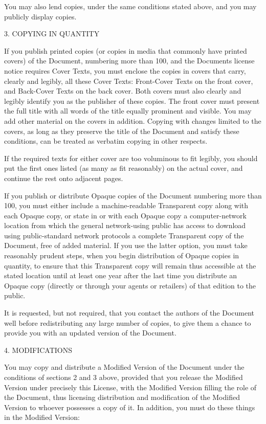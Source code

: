 \documentclass[
  english,
  11pt,
  a4paper,
]{article}
\begin{document}
You may also lend copies, under the same conditions stated above, and
you may publicly display copies.

3. COPYING IN QUANTITY

If you publish printed copies (or copies in media that commonly have
printed covers) of the Document, numbering more than 100, and the
Document\textquotesingle s license notice requires Cover Texts, you must
enclose the copies in covers that carry, clearly and legibly, all these
Cover Texts: Front-Cover Texts on the front cover, and Back-Cover Texts
on the back cover. Both covers must also clearly and legibly identify
you as the publisher of these copies. The front cover must present the
full title with all words of the title equally prominent and visible.
You may add other material on the covers in addition. Copying with
changes limited to the covers, as long as they preserve the title of the
Document and satisfy these conditions, can be treated as verbatim
copying in other respects.

If the required texts for either cover are too voluminous to fit
legibly, you should put the first ones listed (as many as fit
reasonably) on the actual cover, and continue the rest onto adjacent
pages.

If you publish or distribute Opaque copies of the Document numbering
more than 100, you must either include a machine-readable Transparent
copy along with each Opaque copy, or state in or with each Opaque copy a
computer-network location from which the general network-using public
has access to download using public-standard network protocols a
complete Transparent copy of the Document, free of added material. If
you use the latter option, you must take reasonably prudent steps, when
you begin distribution of Opaque copies in quantity, to ensure that this
Transparent copy will remain thus accessible at the stated location
until at least one year after the last time you distribute an Opaque
copy (directly or through your agents or retailers) of that edition to
the public.

It is requested, but not required, that you contact the authors of the
Document well before redistributing any large number of copies, to give
them a chance to provide you with an updated version of the Document.

4. MODIFICATIONS

You may copy and distribute a Modified Version of the Document under the
conditions of sections 2 and 3 above, provided that you release the
Modified Version under precisely this License, with the Modified Version
filling the role of the Document, thus licensing distribution and
modification of the Modified Version to whoever possesses a copy of it.
In addition, you must do these things in the Modified Version:
\end{document}
